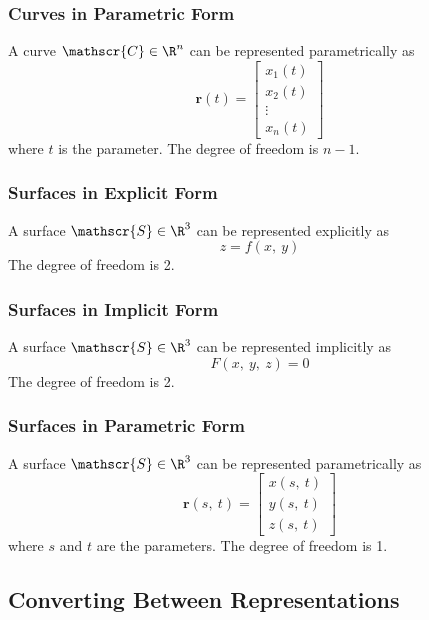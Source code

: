 \documentclass{article}
\begin{document}
\subsubsection{Curves in Parametric Form}
A curve \(\mathscr{C} \in \R^n\) can be represented parametrically as
\begin{equation*}
    \symbf{r}\left( t \right) =
    \begin{bmatrix}
        x_1\left( t \right) \\
        x_2\left( t \right) \\
        \vdots              \\
        x_n\left( t \right)
    \end{bmatrix}
\end{equation*}
where \(t\) is the parameter. The degree of freedom is \(n - 1\).
\subsubsection{Surfaces in Explicit Form}
A surface \(\mathscr{S} \in \R^3\) can be represented explicitly as
\begin{equation*}
    z = f\left( x,\: y \right)
\end{equation*}
The degree of freedom is 2.
\subsubsection{Surfaces in Implicit Form}
A surface \(\mathscr{S} \in \R^3\) can be represented implicitly as
\begin{equation*}
    F\left( x,\: y,\: z \right) = 0
\end{equation*}
The degree of freedom is 2.
\subsubsection{Surfaces in Parametric Form}
A surface \(\mathscr{S} \in \R^3\) can be represented parametrically as
\begin{equation*}
    \symbf{r}\left( s,\: t \right) =
    \begin{bmatrix}
        x\left( s,\: t \right) \\
        y\left( s,\: t \right) \\
        z\left( s,\: t \right)
    \end{bmatrix}
\end{equation*}
where \(s\) and \(t\) are the parameters. The degree of freedom is 1.
\subsection{Converting Between Representations}
\end{document}
